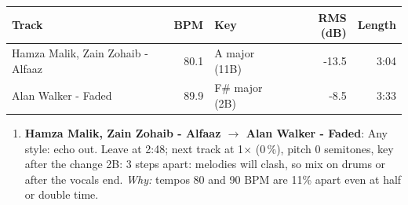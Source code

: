 \begin{tabularx}{\linewidth}{@{}Xrlrr@{}}\toprule
Track & BPM & Key & RMS (dB) & Length \\\midrule
Hamza Malik, Zain Zohaib - Alfaaz & 80.1 & A major (11B) & -13.5 & 3:04 \\
Alan Walker - Faded & 89.9 & F\# major (2B) & -8.5 & 3:33 \\
\bottomrule\end{tabularx}

\begin{enumerate}
\item \textbf{Hamza Malik, Zain Zohaib - Alfaaz $\to$ Alan Walker - Faded}: Any style: echo out. Leave at 2:48; next track at 1$\times$ (0\,\%), pitch 0 semitones, key after the change 2B: 3 steps apart: melodies will clash, so mix on drums or after the vocals end. \emph{Why:} tempos 80 and 90 BPM are 11\% apart even at half or double time.
\end{enumerate}

